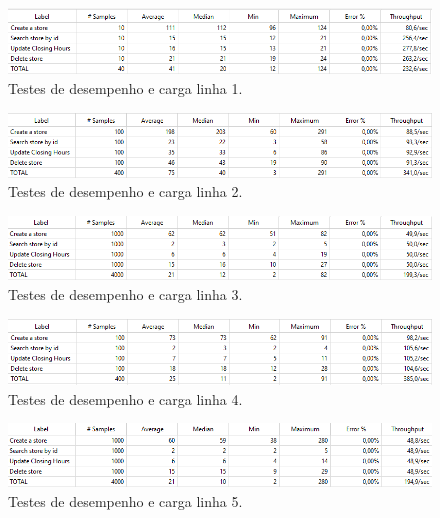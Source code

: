 \begin{figure}[H]
	\centering
	\includegraphics[scale=0.7]{figures/print1teste.png}
	\caption{Testes de desempenho e carga linha 1.}
	\label{fig:teste1}
\end{figure}
\begin{figure}[H]
	\centering
	\includegraphics[scale=0.7]{figures/print2teste.png}
	\caption{Testes de desempenho e carga linha 2.}
	\label{fig:teste2}
\end{figure}

\begin{figure}[H]
	\centering
	\includegraphics[scale=0.7]{figures/print3teste.png}
	\caption{Testes de desempenho e carga linha 3.}
	\label{fig:teste3}
\end{figure}

\begin{figure}[H]
	\centering
	\includegraphics[scale=0.7]{figures/print4teste.png}
	\caption{Testes de desempenho e carga linha 4.}
	\label{fig:teste4}
\end{figure}

\begin{figure}[H]
	\centering
	\includegraphics[scale=0.7]{figures/print5teste.png}
	\caption{Testes de desempenho e carga linha 5.}
	\label{fig:teste5}
\end{figure}

